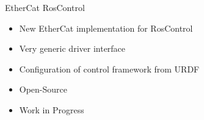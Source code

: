 \documentclass[12pt,a4paper]{article}
\newcommand{\emptylogo}{\texttt{[image: Figures/Empty]}}
\begin{document}
\begin{slidetop}
\begin{multicols}{2}
\begin{bclogo}[couleur = white, arrondi = 0.25, couleurBord = tuedarkblue , barre = none, logo=\emptylogo]{\textcolor{tuedarkblue}{EtherCat RosControl}}
\medskip %
\begin{itemize}[itemsep = 0pt, parsep = 0pt, leftmargin=15pt]
	\item New EtherCat implementation for RosControl
    \item Very generic driver interface
	\item Configuration of control framework from URDF
    \item Open-Source
    \item Work in Progress
\end{itemize}
\end{bclogo}


\end{multicols}
\end{slidetop}
\end{document}

